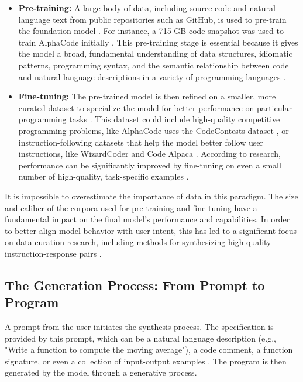 \documentclass[12pt, a4paper]{report}
\begin{document}
\begin{itemize}
    \item \textbf{Pre-training:} A large body of data, including source code and natural language text from public repositories such as GitHub, is used to pre-train the foundation model \citep{chen2021evaluating}. For instance, a 715 GB code snapshot was used to train AlphaCode initially \citep{li2022competition}. This pre-training stage is essential because it gives the model a broad, fundamental understanding of data structures, idiomatic patterns, programming syntax, and the semantic relationship between code and natural language descriptions in a variety of programming languages \citep{zhao2023survey}.
    \item \textbf{Fine-tuning:} The pre-trained model is then refined on a smaller, more curated dataset to specialize the model for better performance on particular programming tasks \citep{li2022competition}. This dataset could include high-quality competitive programming problems, like AlphaCode uses the CodeContests dataset \citep{li2022competition}, or instruction-following datasets that help the model better follow user instructions, like WizardCoder and Code Alpaca \citep{luo2023wizardcoder, taori2023alpaca}. According to research, performance can be significantly improved by fine-tuning on even a small number of high-quality, task-specific examples \citep{austin2021multilingual}.
\end{itemize}

It is impossible to overestimate the importance of data in this paradigm. The size and caliber of the corpora used for pre-training and fine-tuning have a fundamental impact on the final model's performance and capabilities. In order to better align model behavior with user intent, this has led to a significant focus on data curation research, including methods for synthesizing high-quality instruction-response pairs \citep{luo2023wizardcoder}.

\subsection{The Generation Process: From Prompt to Program}

A prompt from the user initiates the synthesis process. The specification is provided by this prompt, which can be a natural language description (e.g., "Write a function to compute the moving average"), a code comment, a function signature, or even a collection of input-output examples \citep{brown2020language}. The program is then generated by the model through a generative process.
\end{document}
